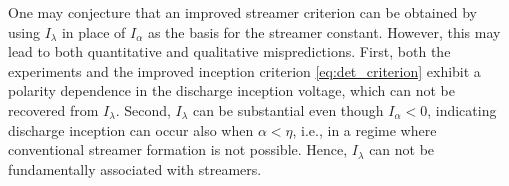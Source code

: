 \documentclass{iopjournal}
\begin{document}
One may conjecture that an improved streamer criterion can be obtained by using $I_\lambda$ in place of $I_\alpha$ as the basis for the streamer constant.
However, this may lead to both quantitative and qualitative mispredictions.
First, both the experiments and the improved inception criterion \eqref{eq:det_criterion} exhibit a polarity dependence in the discharge inception voltage, which can not be recovered from $I_\lambda$.
Second, $I_\lambda$ can be substantial even though $I_\alpha < 0$, indicating discharge inception can occur also when $\alpha < \eta$, i.e., in a regime where conventional streamer formation is not possible.
Hence, $I_\lambda$ can not be fundamentally associated with streamers.

\end{document}
